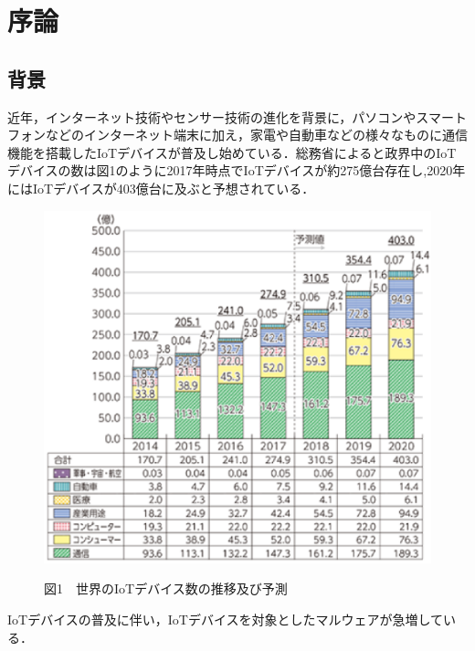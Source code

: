 \chapter{序論} %


\section{背景} %


近年，インターネット技術やセンサー技術の進化を背景に，パソコンやスマートフォンなどのインターネット端末に加え，家電や自動車などの様々なものに通信機能を搭載したIoTデバイスが普及し始めている．総務省によると政界中のIoTデバイスの数は図1のように2017年時点でIoTデバイスが約275億台存在し,2020年にはIoTデバイスが403億台に及ぶと予想されている\cite{IoT}．
 \begin{figure}[h]
 \centering
    \includegraphics{figures/IoT_device.eps}
 \label{fi:model}
 \begin{center}図1　世界のIoTデバイス数の推移及び予測\end{center}
 \end{figure}
IoTデバイスの普及に伴い，IoTデバイスを対象としたマルウェアが急増している．
